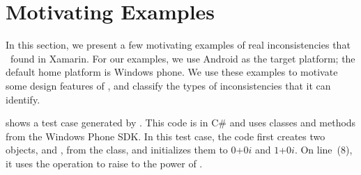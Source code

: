 \section{Motivating Examples}
\label{section:example}

In this section, we present a few motivating examples of real inconsistencies
that \tool\ found in Xamarin. For our examples, we use Android as the target
platform; the default home platform is Windows phone.  We use these examples to
motivate some design features of \tool, and classify the types of
inconsistencies that it can identify. 

 shows a test case generated by \tool. This code
is in C\# and uses classes and methods from the Windows Phone SDK. In this test
case, the code first creates two objects,  and , from the
 class, and initializes them to $0$+$0i$ and
$1$+$0i$. On line~(8), it uses the  operation to raise
 to the power of .

